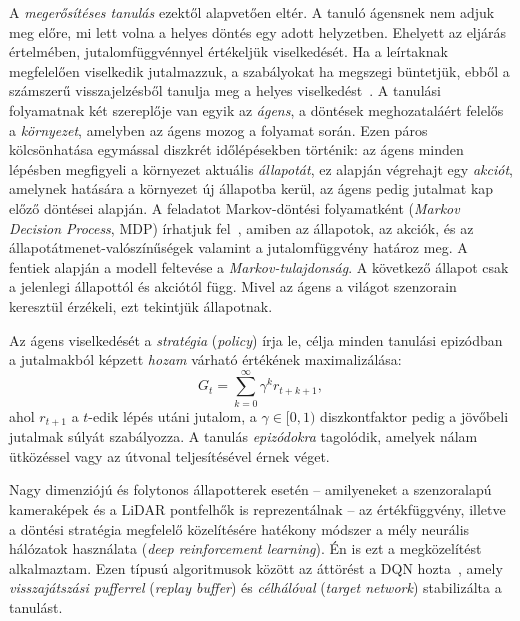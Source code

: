 \documentclass[a4paper,12pt,oneside]{article}
\begin{document}
A \emph{megerősítéses tanulás} ezektől alapvetően eltér. A tanuló
ágensnek nem adjuk meg előre, mi lett volna a helyes döntés egy adott
helyzetben. Ehelyett az eljárás értelmében, jutalomfüggvénnyel értékeljük viselkedését.
Ha a leírtaknak megfelelően viselkedik jutalmazzuk, a szabályokat ha megszegi büntetjük, 
ebből a számszerű visszajelzésből tanulja meg a helyes viselkedést~\cite{sutton2018rl}. 
A tanulási folyamatnak két szereplője van egyik az \emph{ágens}, a döntések meghozataláért felelős
a \emph{környezet}, amelyben az ágens mozog a folyamat során. Ezen páros kölcsönhatása egymással diszkrét 
időlépésekben történik: az ágens minden lépésben
megfigyeli a környezet aktuális \emph{állapotát}, ez alapján végrehajt egy
\emph{akciót}, amelynek hatására a környezet új állapotba kerül, az ágens pedig
jutalmat kap előző döntései alapján. A feladatot Markov-döntési folyamatként (\emph{Markov Decision Process}, MDP)
írhatjuk fel~\cite{sutton2018rl}, amiben az állapotok, az akciók, és az állapotátmenet-valószínűségek valamint a 
jutalomfüggvény határoz meg. A fentiek alapján a modell feltevése a \emph{Markov-tulajdonság}. A következő
állapot csak a jelenlegi állapottól és akciótól függ. Mivel az ágens a világot
szenzorain keresztül érzékeli, ezt tekintjük állapotnak.

Az ágens viselkedését a \emph{stratégia} (\emph{policy}) írja le, 
célja minden tanulási epizódban a jutalmakból képzett \emph{hozam} 
várható értékének maximalizálása:
\begin{equation}
  G_t = \sum_{k=0}^{\infty} \gamma^k r_{t+k+1},
\end{equation}
ahol $r_{t+1}$ a $t$-edik lépés utáni jutalom, a $\gamma \in [0, 1)$
diszkontfaktor pedig a jövőbeli jutalmak súlyát szabályozza. A tanulás
\emph{epizódokra} tagolódik, amelyek nálam ütközéssel vagy az útvonal
teljesítésével érnek véget.

Nagy dimenziójú és folytonos állapotterek esetén – amilyeneket a 
szenzoralapú kameraképek és a LiDAR pontfelhők is reprezentálnak – az 
értékfüggvény, illetve a döntési stratégia megfelelő közelítésére
hatékony módszer a mély neurális hálózatok használata
(\emph{deep reinforcement learning}). Én is ezt a megközelítést alkalmaztam. Ezen típusú algoritmusok között az áttörést a DQN hozta~\cite{mnih2015dqn}, amely
\emph{visszajátszási pufferrel} (\emph{replay buffer}) és \emph{célhálóval}
(\emph{target network}) stabilizálta a tanulást. 
\end{document}
